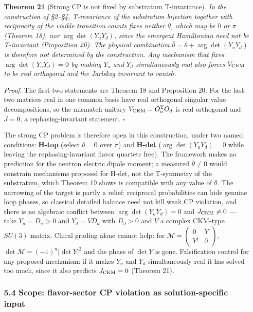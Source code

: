 \documentclass[
]{article}
\begin{document}
\textbf{Theorem 21} (Strong CP is not fixed by substratum T-invariance).
\emph{In the construction of §2--§4, T-invariance of the substratum
bijection together with reciprocity of the visible transition counts
fixes neither \(\theta\), which may be \(0\) or \(\pi\) (Theorem 18),
nor \(\arg\det(Y_uY_d)\), since the emergent Hamiltonian need not be
T-invariant (Proposition 20). The physical combination
\(\bar\theta=\theta+\arg\det(Y_uY_d)\) is therefore not determined by
the construction. Any mechanism that fixes \(\arg\det(Y_uY_d)=0\) by
making \(Y_u\) and \(Y_d\) simultaneously real also forces
\(V_{\rm CKM}\) to be real orthogonal and the Jarlskog invariant to
vanish.}

\emph{Proof.} The first two statements are Theorem 18 and Proposition
20. For the last: two matrices real in one common basis have real
orthogonal singular value decompositions, so the mismatch unitary
\(V_{\rm CKM}=O_u^{\mathrm T}O_d\) is real orthogonal and \(J=0\), a
rephasing-invariant statement. \(\square\)

The strong CP problem is therefore open in this construction, under two
named conditions: \textbf{H-top} (select \(\theta=0\) over \(\pi\)) and
\textbf{H-det} (\(\arg\det(Y_uY_d)=0\) while leaving the
rephasing-invariant flavor quartets free). The framework makes no
prediction for the neutron electric dipole moment; a measured
\(\bar\theta\neq0\) would constrain mechanisms proposed for H-det, not
the T-symmetry of the substratum, which Theorem 19 shows is compatible
with any value of \(\bar\theta\). The narrowing of the target is partly
a relief: reciprocal probabilities can hide genuine loop phases, so
classical detailed balance need not kill weak CP violation, and there is
no algebraic conflict between \(\arg\det(Y_uY_d)=0\) and
\(J_{\rm CKM}\neq0\) --- take \(Y_u=D_u>0\) and \(Y_d=VD_d\) with
\(D_d>0\) and \(V\) a complex CKM-type \(SU(3)\) matrix. Chiral grading
alone cannot help: for
\(\mathcal M=\begin{pmatrix}0&Y\\ Y^\dagger&0\end{pmatrix}\),
\(\det\mathcal M=(-1)^n|\det Y|^2\) and the phase of \(\det Y\) is gone.
Falsification control for any proposed mechanism: if it makes \(Y_u\)
and \(Y_d\) simultaneously real it has solved too much, since it also
predicts \(J_{\rm CKM}=0\) (Theorem 21).

\hypertarget{scope-flavor-sector-cp-violation-as-solution-specific-input}{%
\subsubsection{5.4 Scope: flavor-sector CP violation as
solution-specific
input}\label{scope-flavor-sector-cp-violation-as-solution-specific-input}}
\end{document}
